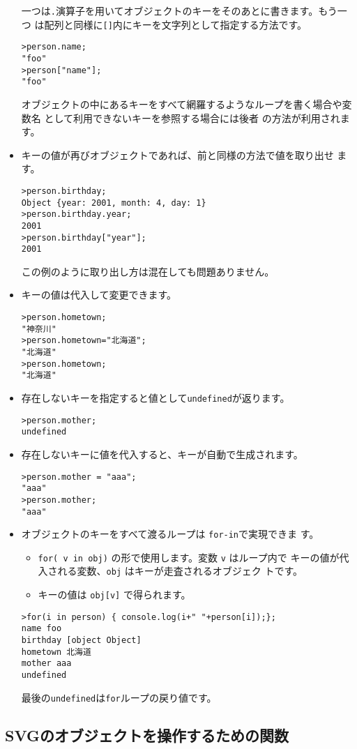 \begin{itemize}
一つは\Verb+.+演算子を用いてオブジェクトのキーをそのあとに書きます。もう一つ
       は配列と同様に\Verb+[]+内にキーを文字列として指定する方法です。
\begin{Verbatim}
>person.name;
"foo"
>person["name"];
"foo"
\end{Verbatim}
オブジェクトの中にあるキーをすべて網羅するようなループを書く場合や変数名
       として利用できないキーを参照する場合には後者
       の方法が利用されます。
 \item キーの値が再びオブジェクトであれば、前と同様の方法で値を取り出せ
       ます。
\begin{Verbatim}
>person.birthday;
Object {year: 2001, month: 4, day: 1}
>person.birthday.year;
2001
>person.birthday["year"];
2001
\end{Verbatim}
この例のように取り出し方は混在しても問題ありません。
 \item キーの値は代入して変更できます。
\begin{Verbatim}
>person.hometown;
"神奈川"
>person.hometown="北海道";
"北海道"
>person.hometown;
"北海道"
\end{Verbatim}
 \item 存在しないキーを指定すると値として\Verb+undefined+が返ります。
\begin{Verbatim}
>person.mother;
undefined
\end{Verbatim}
 \item 存在しないキーに値を代入すると、キーが自動で生成されます。
\begin{Verbatim}
>person.mother = "aaa";
"aaa"
>person.mother;
"aaa"
\end{Verbatim}
 \item オブジェクトのキーをすべて渡るループは \verb+for-in+で実現できま
			 す。
\begin{itemize}
 \item \Verb+for( v in obj)+ の形で使用します。変数 \Verb+v+ はループ内で
       キーの値が代入される変数、\Verb+obj+ はキーが走査されるオブジェク
       トです。
 \item キーの値は \Verb+obj[v]+ で得られます。
\end{itemize}
\begin{Verbatim}
>for(i in person) { console.log(i+" "+person[i]);};
name foo
birthday [object Object]
hometown 北海道
mother aaa
undefined
\end{Verbatim}
最後の\Verb+undefined+は\Verb+for+ループの戻り値です。
\end{itemize}

\subsection{SVGのオブジェクトを操作するための関数}
\iffalse
錯視の図形は数学的に規則正しい図形が多くあります。
SVG文書の開始時の\Event{onload}の処理関数で要素を追加すれば
今まで、手でSVGの個々の要素を指定していた図形がより簡単に描けます。
\fi

